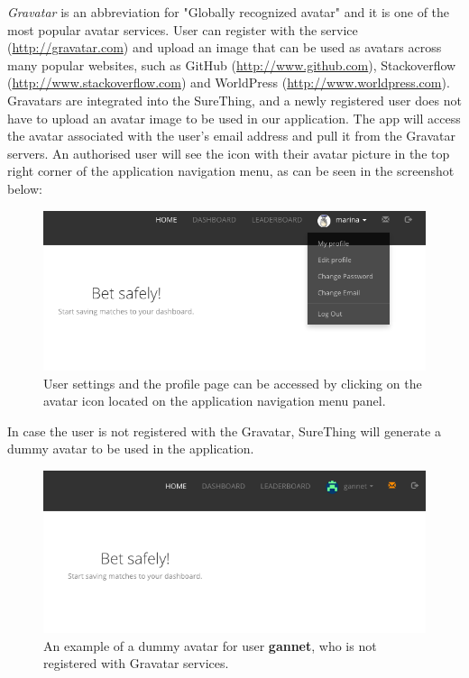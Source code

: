 \emph{Gravatar} is an abbreviation for "Globally recognized avatar" and it is one of the most popular avatar services. User can register with the service (\url{http://gravatar.com}) and upload an image that can be used as avatars across many popular websites, such as GitHub (\url{http://www.github.com}), Stackoverflow (\url{http://www.stackoverflow.com}) and WorldPress (\url{http://www.worldpress.com}). Gravatars are integrated into the SureThing, and a newly registered user does not have to upload an avatar image to be used in our application. The app will access the avatar associated with the user's email address and pull it from the Gravatar servers. An authorised user will see the icon with their avatar picture in the top right corner of the application navigation menu, as can be seen in the screenshot below:

\begin{figure}[H]
	\begin{center}
		\includegraphics[width=.90\textwidth]{impl/images/gravatar}
		\caption{User settings and the profile page can be accessed by clicking on the avatar icon located on the application navigation menu panel.} \label{fig:gravatar}
	\end{center}
\end{figure}

In case the user is not registered with the Gravatar, SureThing will generate a dummy avatar to be used in the application.

\begin{figure}[H]
	\begin{center}
		\includegraphics[width=.90\textwidth]{impl/images/dummyGravatar}
		\caption{An example of a dummy avatar for user \textbf{gannet}, who is not registered with Gravatar services.} \label{fig:dummygravatar}
	\end{center}
\end{figure}


